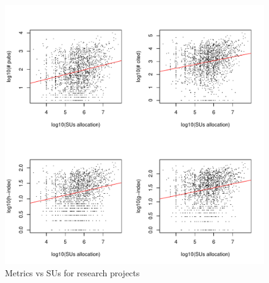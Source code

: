 \documentclass{sig-alternate}
\begin{document}
\begin{figure}[htb] 
  \centering 
    \includegraphics[width=1.0\columnwidth]{images/02_metrics_vs_alloc_research_proj.pdf} 
  \caption{Metrics vs SUs for research projects}\label{F:metrics-vs-alloc-research-proj} 
\end{figure} 
 
 
 
\end{document}
